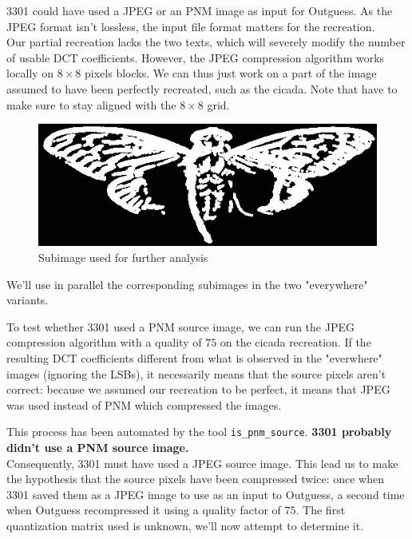 \documentclass{article}
\begin{document}
3301 could have used a JPEG or an PNM image as input for Outguess. As the JPEG format isn't lossless, the input file format matters for the recreation. \\

Our partial recreation lacks the two texts, which will severely modify the number of usable DCT coefficients. However, the JPEG compression algorithm works locally on $8 \times 8$ pixels blocks. We can thus just work on a part of the image assumed to have been perfectly recreated, such as the cicada. Note that have to make sure to stay aligned with the $8 \times 8$ grid.

\begin{figure}[h]
	\centering
	
	\includegraphics[scale=0.3]{partial_cicada_reconstruction}
	
	\caption{Subimage used for further analysis}
\end{figure}
\FloatBarrier

We'll use in parallel the corresponding subimages in the two "everywhere" variants.

To test whether 3301 used a PNM source image, we can run the JPEG compression algorithm with a quality of $75$ on the cicada recreation. If the resulting DCT coefficients different from what is observed in the "everwhere" images (ignoring the LSBs), it necessarily means that the source pixels aren't correct: because we assumed our recreation to be perfect, it means that JPEG was used instead of PNM which compressed the images.

This process has been automated by the tool \texttt{is\_pnm\_source}. \textbf{3301 probably didn't use a PNM source image.} \\

Consequently, 3301 must have used a JPEG source image. This lead us to make the hypothesis that the source pixels have been compressed twice: once when 3301 saved them as a JPEG image to use as an input to Outguess, a second time when Outguess recompressed it using a quality factor of $75$. The first quantization matrix used is unknown, we'll now attempt to determine it. \\
\end{document}
